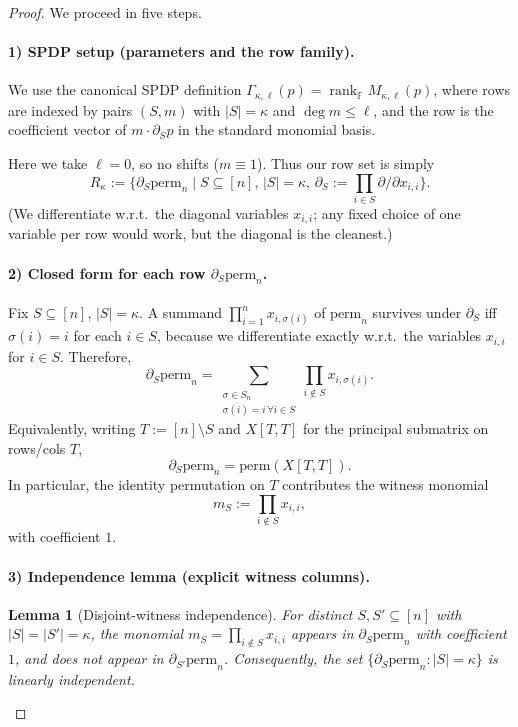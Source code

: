 \documentclass[12pt]{article}
\newtheorem{lemma}[theorem]{Lemma}
\theoremstyle{definition}
\theoremstyle{definition}
\theoremstyle{remark}
\theoremstyle{remark}
\begin{document}
\begin{proof}
We proceed in five steps.

\paragraph{1) SPDP setup (parameters and the row family).}
We use the canonical SPDP definition $\Gamma_{\kappa,\ell}(p) = \operatorname{rank}_\mathbb{F} M_{\kappa,\ell}(p)$, where rows are indexed by pairs $(S,m)$ with $|S| = \kappa$ and $\deg m \leq \ell$, and the row is the coefficient vector of $m \cdot \partial_S p$ in the standard monomial basis.

Here we take $\ell = 0$, so no shifts ($m \equiv 1$). Thus our row set is simply
\[
R_\kappa := \{\partial_S \mathrm{perm}_n \mid S \subseteq [n],\, |S| = \kappa,\, \partial_S := \prod_{i \in S} \partial/\partial x_{i,i}\}.
\]
(We differentiate w.r.t.\ the diagonal variables $x_{i,i}$; any fixed choice of one variable per row would work, but the diagonal is the cleanest.)

\paragraph{2) Closed form for each row $\partial_S \mathrm{perm}_n$.}
Fix $S \subseteq [n]$, $|S| = \kappa$. A summand $\prod_{i=1}^n x_{i,\sigma(i)}$ of $\mathrm{perm}_n$ survives under $\partial_S$ iff $\sigma(i) = i$ for each $i \in S$, because we differentiate exactly w.r.t.\ the variables $x_{i,i}$ for $i \in S$. Therefore,
\[
\partial_S \mathrm{perm}_n = \sum_{\substack{\sigma \in S_n \\ \sigma(i) = i\,\forall i \in S}} \prod_{i \notin S} x_{i,\sigma(i)}.
\]
Equivalently, writing $T := [n] \setminus S$ and $X[T,T]$ for the principal submatrix on rows/cols $T$,
\[
\partial_S \mathrm{perm}_n = \mathrm{perm}(X[T,T]).
\]
In particular, the identity permutation on $T$ contributes the witness monomial
\[
m_S := \prod_{i \notin S} x_{i,i},
\]
with coefficient $1$.

\paragraph{3) Independence lemma (explicit witness columns).}
\begin{lemma}[Disjoint-witness independence]\label{lem:disjoint-witness}
For distinct $S, S' \subseteq [n]$ with $|S| = |S'| = \kappa$, the monomial $m_S = \prod_{i \notin S} x_{i,i}$ appears in $\partial_S \mathrm{perm}_n$ with coefficient $1$, and does not appear in $\partial_{S'} \mathrm{perm}_n$. Consequently, the set $\{\partial_S \mathrm{perm}_n : |S| = \kappa\}$ is linearly independent.
\end{lemma}


\end{proof}
\end{document}
